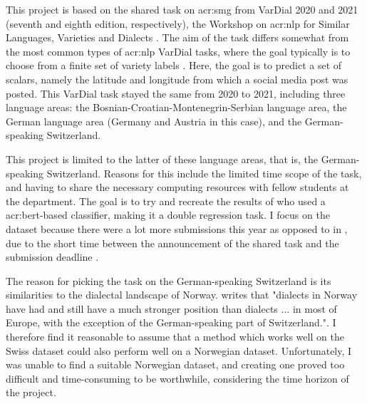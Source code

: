 \begin{comment}
The introduction can also briefly describe what methodology you will apply to reach the goal and the reasons for this choice of research methodology.
It can furthermore provide a brief summary of the main contributions of the work,
and should provide the reader with an overview of what is coming in the next sections.
You want to say more than what is explicit in the section names, if possible, but still keep the description short and to the point.
\end{comment}

This project is based on the shared task on \gls{acr:smg} from VarDial 2020 and 2021 (seventh and eighth edition, respectively), the Workshop on \gls{acr:nlp} for Similar Languages, Varieties and Dialects \citep{gamanReportVarDialEvaluation2020, chakravarthiFindingsVarDialEvaluation2021}. The aim of the task differs somewhat from the most common types of \gls{acr:nlp} VarDial tasks, where the goal typically is to choose from a finite set of variety labels \citep[1]{scherrerSocialMediaVariety2021}. Here, the goal is to predict a set of scalars, namely the latitude and longitude from which a social media post was posted. This VarDial task stayed the same from 2020 to 2021, including three language areas: the Bosnian-Croatian-Montenegrin-Serbian language area, the German language area (Germany and Austria in this case), and the German-speaking Switzerland.

This project is limited to the latter of these language areas, that is, the German-speaking Switzerland. Reasons for this include the limited time scope of the task, and having to share the necessary computing resources with fellow students at the department. The goal is to try and recreate the results of \cite{scherrerHeLjuVarDial20202020} who used a \acrshort{acr:bert}-based classifier, making it a double regression task. I focus on the \citeyear{scherrerHeLjuVarDial20202020} dataset because there were a lot more submissions this year as opposed to in \citeyear{scherrerSocialMediaVariety2021}, due to the short time between the announcement of the shared task and the submission deadline \citep[6]{chakravarthiFindingsVarDialEvaluation2021}.

The reason for picking the task on the German-speaking Switzerland is its similarities to the dialectal landscape of Norway. \cite[14]{roynelandDialectsNorwayCatching2009} writes that "dialects in Norway have had and still have a much stronger position than dialects ... in most of Europe, with the exception of the German-speaking part of Switzerland.". I therefore find it reasonable to assume that a method which works well on the Swiss dataset could also perform well on a Norwegian dataset. Unfortunately, I was unable to find a suitable Norwegian dataset, and creating one proved too difficult and time-consuming to be worthwhile, considering the time horizon of the project.